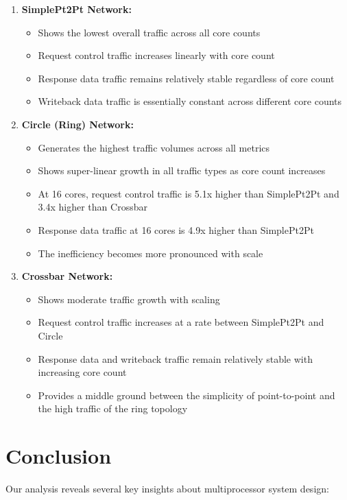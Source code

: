 \documentclass[9pt]{IEEEtran}
\begin{document}
\begin{enumerate}
  \item \textbf{SimplePt2Pt Network:}
  \begin{itemize}
    \item Shows the lowest overall traffic across all core counts
    \item Request control traffic increases linearly with core count
    \item Response data traffic remains relatively stable regardless of core count
    \item Writeback data traffic is essentially constant across different core counts
  \end{itemize}

  \item \textbf{Circle (Ring) Network:}
  \begin{itemize}
    \item Generates the highest traffic volumes across all metrics
    \item Shows super-linear growth in all traffic types as core count increases
    \item At 16 cores, request control traffic is 5.1x higher than SimplePt2Pt and 3.4x higher than Crossbar
    \item Response data traffic at 16 cores is 4.9x higher than SimplePt2Pt
    \item The inefficiency becomes more pronounced with scale
  \end{itemize}

  \item \textbf{Crossbar Network:}
  \begin{itemize}
    \item Shows moderate traffic growth with scaling
    \item Request control traffic increases at a rate between SimplePt2Pt and Circle
    \item Response data and writeback traffic remain relatively stable with increasing core count
    \item Provides a middle ground between the simplicity of point-to-point and the high traffic of the ring topology
  \end{itemize}
\end{enumerate}

\section{Conclusion}
Our analysis reveals several key insights about multiprocessor system design:
\end{document}
